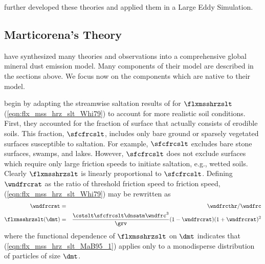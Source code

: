 \documentclass[12pt,twoside]{book}
\begin{document}
\cite{ShL99} further developed these theories and applied
them in a Large Eddy Simulation.

\subsection[Marticorena's Theory]{Marticorena's Theory}\label{sxn:vrt_MaB95}
\cite{MaB95} have synthesized many theories and observations into a
comprehensive global mineral dust emission model.
Many components of their model are described in the sections above.
We focus now on the components which are native to their model.

\cite{MaB95} begin by adapting the streamwise saltation results of
\cite{Whi79} for $\flxmsshrzslt$ (\ref{eqn:flx_mss_hrz_slt_Whi79}) to
account for more realistic soil conditions.
First, they accounted for the fraction of surface that actually
consists of erodible soils.
This fraction, $\sfcfrcslt$, includes only bare ground or sparsely
vegetated surfaces susceptible to saltation.
For example, $\sfcfrcslt$ excludes bare stone surfaces, swamps, and
lakes. 
However, $\sfcfrcslt$ does not exclude surfaces which require only
large friction speeds to initiate saltation, e.g., wetted soils.
Clearly $\flxmsshrzslt$ is linearly proportional to $\sfcfrcslt$.
Defining $\wndfrcrat$ as the ratio of threshold friction speed to
friction speed, (\ref{eqn:flx_mss_hrz_slt_Whi79}) may be rewritten as 
\begin{eqnarray}
\wndfrcrat & = & \wndfrcthr / \wndfrc \nonumber \\
\flxmsshrzslt(\dmt) & = & \frac{\cstslt \sfcfrcslt \dnsatm \wndfrc^{3}}{\grv } 
( 1 - \wndfrcrat ) ( 1 + \wndfrcrat )^{2}
\label{eqn:flx_mss_hrz_slt_MaB95_1}
\end{eqnarray}
where the functional dependence of $\flxmsshrzslt$ on $\dmt$ indicates 
that (\ref{eqn:flx_mss_hrz_slt_MaB95_1}) applies only to a
monodisperse distribution of particles of size $\dmt$.
\end{document}
